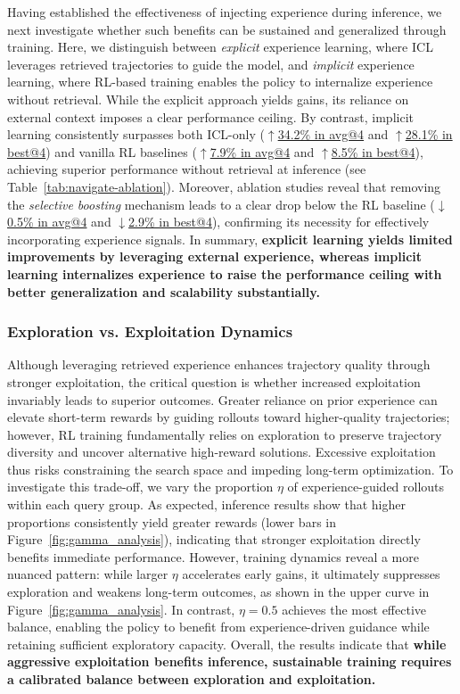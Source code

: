 Having established the effectiveness of injecting experience during inference, we next investigate whether such benefits can be sustained and generalized through training. 
Here, we distinguish between \emph{explicit} experience learning, where ICL leverages retrieved trajectories to guide the model, and \emph{implicit} experience learning, where RL-based training enables the policy to internalize experience without retrieval. 
While the explicit approach yields gains, its reliance on external context imposes a clear performance ceiling.
By contrast, implicit learning consistently surpasses both ICL-only (\underline{$\uparrow$34.2\% in avg@4} and \underline{$\uparrow$28.1\% in best@4}) and vanilla RL baselines (\underline{$\uparrow$7.9\% in avg@4} and \underline{$\uparrow$8.5\% in best@4}), achieving superior performance without retrieval at inference (see Table~\ref{tab:navigate-ablation}).
Moreover, ablation studies reveal that removing the \emph{selective boosting} mechanism leads to a clear drop below the RL baseline (\underline{$\downarrow$0.5\% in avg@4} and \underline{$\downarrow$2.9\% in best@4}), confirming its necessity for effectively incorporating experience signals. 
In summary, \textbf{explicit learning yields limited improvements by leveraging external experience, whereas implicit learning internalizes experience to raise the performance ceiling with better generalization and scalability substantially.}


\subsubsection{Exploration vs. Exploitation Dynamics}
Although leveraging retrieved experience enhances trajectory quality through stronger exploitation, the critical question is whether increased exploitation invariably leads to superior outcomes. Greater reliance on prior experience can elevate short-term rewards by guiding rollouts toward higher-quality trajectories; however, RL training fundamentally relies on exploration to preserve trajectory diversity and uncover alternative high-reward solutions. Excessive exploitation thus risks constraining the search space and impeding long-term optimization.
To investigate this trade-off, we vary the proportion $\eta$ of experience-guided rollouts within each query group. 
As expected, inference results show that higher proportions consistently yield greater rewards (lower bars in Figure~\ref{fig:gamma_analysis}), indicating that stronger exploitation directly benefits immediate performance.
However, training dynamics reveal a more nuanced pattern: while larger $\eta$ accelerates early gains, it ultimately suppresses exploration and weakens long-term outcomes, as shown in the upper curve in Figure~\ref{fig:gamma_analysis}.
In contrast, $\eta=0.5$ achieves the most effective balance, enabling the policy to benefit from experience-driven guidance while retaining sufficient exploratory capacity.
Overall, the results indicate that \textbf{while aggressive exploitation benefits inference, sustainable training requires a calibrated balance between exploration and exploitation.}

